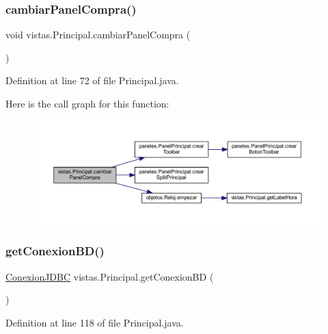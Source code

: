 \subsubsection{\texorpdfstring{cambiar\+Panel\+Compra()}{cambiarPanelCompra()}}
{\footnotesize\ttfamily void vistas.\+Principal.\+cambiar\+Panel\+Compra (\begin{DoxyParamCaption}{ }\end{DoxyParamCaption})}



Definition at line 72 of file Principal.\+java.

Here is the call graph for this function\+:\nopagebreak
\begin{figure}[H]
\begin{center}
\leavevmode
\includegraphics[width=350pt]{classvistas_1_1_principal_aa6783bab03cc60f1bf401d4c16293318_cgraph}
\end{center}
\end{figure}
\mbox{\label{classvistas_1_1_principal_ad7379276c979124d4386d01439f24b42}} 
\subsubsection{\texorpdfstring{get\+Conexion\+B\+D()}{getConexionBD()}}
{\footnotesize\ttfamily \mbox{\hyperlink{classmysql_1_1_conexion_j_d_b_c}{Conexion\+J\+D\+BC}} vistas.\+Principal.\+get\+Conexion\+BD (\begin{DoxyParamCaption}{ }\end{DoxyParamCaption})}



Definition at line 118 of file Principal.\+java.

\mbox{\label{classvistas_1_1_principal_a95e7bccba557226e9e56211a58a2e03c}} 
